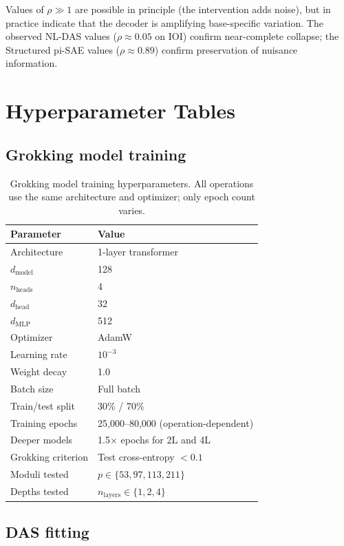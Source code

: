 Values of $\rho \gg 1$ are possible in principle (the intervention adds noise),
but in practice indicate that the decoder is amplifying base-specific variation.
The observed NL-DAS values ($\rho \approx 0.05$ on IOI) confirm near-complete
collapse; the Structured pi-SAE values ($\rho \approx 0.89$) confirm
preservation of nuisance information.


\section{Hyperparameter Tables}
\label{app:hyperparameters}

\subsection{Grokking model training}

\begin{table}[H]
\centering
\small
\setlength{\tabcolsep}{4pt}
\begin{tabular}{ll}
\toprule
\textbf{Parameter} & \textbf{Value} \\
\midrule
Architecture & 1-layer transformer \\
$d_\text{model}$ & 128 \\
$n_\text{heads}$ & 4 \\
$d_\text{head}$ & 32 \\
$d_\text{MLP}$ & 512 \\
Optimizer & AdamW \\
Learning rate & $10^{-3}$ \\
Weight decay & 1.0 \\
Batch size & Full batch \\
Train/test split & 30\% / 70\% \\
Training epochs & 25{,}000--80{,}000 (operation-dependent) \\
Deeper models & 1.5$\times$ epochs for 2L and 4L \\
Grokking criterion & Test cross-entropy $< 0.1$ \\
Moduli tested & $p \in \{53, 97, 113, 211\}$ \\
Depths tested & $n_\text{layers} \in \{1, 2, 4\}$ \\
\bottomrule
\end{tabular}
\caption{Grokking model training hyperparameters. All operations use the same
architecture and optimizer; only epoch count varies.}
\label{tab:hp_grokking}
\end{table}

\subsection{DAS fitting}

